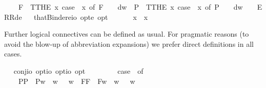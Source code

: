 \begin{isabellebody}
\ \ \ \ F{\isacharparenleft}{\isacharunderscore}{\isacharparenright}\ {\isasymRightarrow}\ T{\isacharparenleft}THE\ x{\isachardot}\ case\ {\isacharparenleft}{\isasymPhi}\ x{\isacharparenright}\ of\ F\ {\isasympsi}\ {\isasymRightarrow}\ {\isasympsi}\ dw{\isacharparenright}\ {\isacharbar}\ P{\isacharparenleft}{\isacharunderscore}{\isacharparenright}\ {\isasymRightarrow}\ T{\isacharparenleft}THE\ x{\isachardot}\ case\ {\isacharparenleft}{\isasymPhi}\ x{\isacharparenright}\ of\ P\ {\isasympsi}\ {\isasymRightarrow}\ {\isasympsi}\ dw{\isacharparenright}\ {\isacharbar}\ {\isacharunderscore}\ {\isasymRightarrow}\ ERR{\isacharparenleft}de{\isacharparenright}{\isachardoublequoteclose}\isanewline
\ \isamarkupfalse%
\ thatBinder{\isacharcolon}{\isacharcolon}{\isachardoublequoteopen}{\isacharparenleft}e{\isasymRightarrow}io\ opt{\isacharparenright}{\isasymRightarrow}e\ opt{\isachardoublequoteclose}\ {\isacharparenleft}\ {\isachardoublequoteopen}\isactrlbold {\isasymiota}{\isachardoublequoteclose}\ {\isacharbrackleft}{}{\isacharbrackright}\ {}{\isacharparenright}\ \ \ {\isachardoublequoteopen}\isactrlbold {\isasymiota}x{\isachardot}\ {\isasymphi}\ x\ {\isasymequiv}\ \isactrlbold {\isasymiota}\ {\isasymphi}{\isachardoublequoteclose}%
\isamarkuptrue%
%
\begin{isamarkuptext}%
Further logical connectives can be defined as usual. For pragmatic reasons (to avoid the blow-up of
  abbreviation expansions) we prefer direct definitions in all cases.%
\end{isamarkuptext}%
\isamarkuptrue%
\ \isamarkupfalse%
\ conj{\isacharcolon}{\isacharcolon}{\isachardoublequoteopen}io\ opt{\isasymRightarrow}io\ opt{\isasymRightarrow}io\ opt{\isachardoublequoteclose}\ {\isacharparenleft}\ {\isachardoublequoteopen}\isactrlbold {\isasymand}{\isachardoublequoteclose}\ {}{}{\isacharparenright}\ \ {\isachardoublequoteopen}{\isasymphi}\ \isactrlbold {\isasymand}\ {\isasympsi}\ {\isasymequiv}\ case\ {\isacharparenleft}{\isasymphi}{\isacharcomma}{\isasympsi}{\isacharparenright}\ of\isanewline
\ \ \ \ {\isacharparenleft}P{\isacharparenleft}{\isasymalpha}{\isacharparenright}{\isacharcomma}P{\isacharparenleft}{\isasymbeta}{\isacharparenright}{\isacharparenright}\ {\isasymRightarrow}\ P{\isacharparenleft}{\isasymlambda}w{\isachardot}\ {\isasymalpha}\ w\ {\isasymand}\ {\isasymbeta}\ w{\isacharparenright}\ {\isacharbar}\ {\isacharparenleft}F{\isacharparenleft}{\isasymalpha}{\isacharparenright}{\isacharcomma}F{\isacharparenleft}{\isasymbeta}{\isacharparenright}{\isacharparenright}\ {\isasymRightarrow}\ F{\isacharparenleft}{\isasymlambda}w{\isachardot}\ {\isasymalpha}\ w\ {\isasymand}\ {\isasymbeta}\ w{\isacharparenright}\ {\isacharbar}\ \isanewline

\end{isabellebody}
